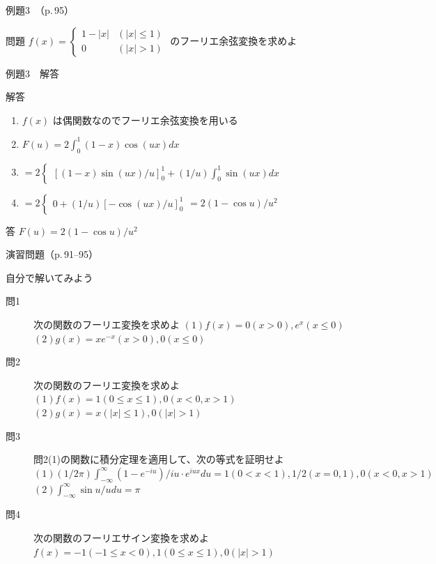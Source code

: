 \documentclass[aspectratio=43,professionalfonts,handout]{beamer}
\begin{document}
\begin{frame}{例題3　（p.\,95）}
  \begin{exampleblock}{問題}
    $f(x) = \begin{cases} 1-|x| & (|x| \leq 1) \\ 0 & (|x| > 1) \end{cases}$ のフーリエ余弦変換を求めよ\\[2pt]
  \end{exampleblock}
\end{frame}

\begin{frame}{例題3　解答}
  \begin{exampleblock}{解答}
  \begin{enumerate}[1.]
    \item[] $f(x)$ は偶関数なのでフーリエ余弦変換を用いる
    \item[] $F(u) = 2\int_{0}^{1} (1-x) \cos(ux) dx$
    \item[] $= 2\begin{cases} [(1-x)\sin(ux)/u]_{0}^1 + (1/u)\int_{0}^1 \sin(ux) dx \end{cases}$
    \item[] $= 2\begin{cases} 0 + (1/u)[-\cos(ux)/u]_{0}^1 \end{cases} = 2(1-\cos u)/u^{2}$
  \end{enumerate}
  \end{exampleblock}
  \begin{alertblock}{答}
    $F(u) = 2(1-\cos u)/u^{2}$
  \end{alertblock}
\end{frame}

\begin{frame}{演習問題（p.\,91--95）}
  \begin{exampleblock}{自分で解いてみよう}
  \begin{description}
    \item[問1] 次の関数のフーリエ変換を求めよ
    $(1) f(x) = { 0  (x > 0),  e^x  (x \leq 0) }$\\
    $(2) g(x) = { xe^{-x}  (x > 0),  0  (x \leq 0) }$\\
    \item[問2] 次の関数のフーリエ変換を求めよ
    $(1) f(x) = { 1  (0 \leq x \leq 1),  0  (x < 0, x > 1) }$\\
    $(2) g(x) = { x  (|x| \leq 1),  0  (|x| > 1) }$\\
    \item[問3] 問2(1)の関数に積分定理を適用して、次の等式を証明せよ
    $(1) (1/2\pi)\int_{-\infty}^{\infty} (1-e^{-iu})/iu \cdot e^{iux} du = { 1  (0<x<1),  1/2  (x=0,1),  0  (x<0, x>1) }$\\
    $(2) \int_{-\infty}^{\infty} \sin u / u  du = \pi$\\
    \item[問4] 次の関数のフーリエサイン変換を求めよ
    $f(x) = { -1  (-1 \leq x < 0),  1  (0 \leq x \leq 1),  0  (|x| > 1) }$\\
  \end{description}
  \end{exampleblock}
\end{frame}
\end{document}
